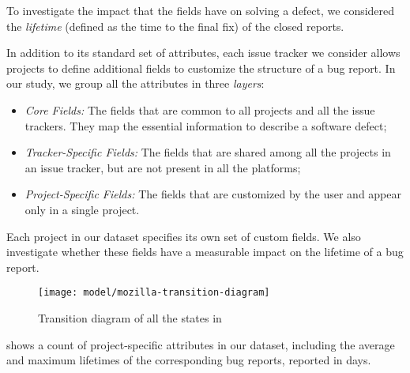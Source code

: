 To investigate the impact that the fields have on solving a defect, we considered the \emph{lifetime} (defined as the time to the final fix) of the closed reports.

In addition to its standard set of attributes, each issue tracker we consider allows projects to define additional fields to customize the structure of a bug report.
In our study, we group all the attributes in three \emph{layers}:

\begin{itemize}[$\circ$]
\item \textit{Core Fields:} The fields that are common to all projects and all the issue trackers.
They map the essential information to describe a software defect;
\item \textit{Tracker-Specific Fields:} The fields that are shared among all the projects in an issue tracker, but are not present in all the platforms;
\item \textit{Project-Specific Fields:} The fields that are customized by the user and appear only in a single project.
\end{itemize}

Each project in our dataset specifies its own set of custom fields.
We also investigate whether these fields have a measurable impact on the lifetime of a bug report.

\begin{figure}[!ht]
\centering
\texttt{[image: model/mozilla-transition-diagram]}
\caption{Transition diagram of all the states in \bzilla}
\label{fig:mozilla_transitions}
\end{figure}

  shows a count of project-specific attributes in our dataset, including the average and maximum lifetimes of the corresponding bug reports, reported in days.

